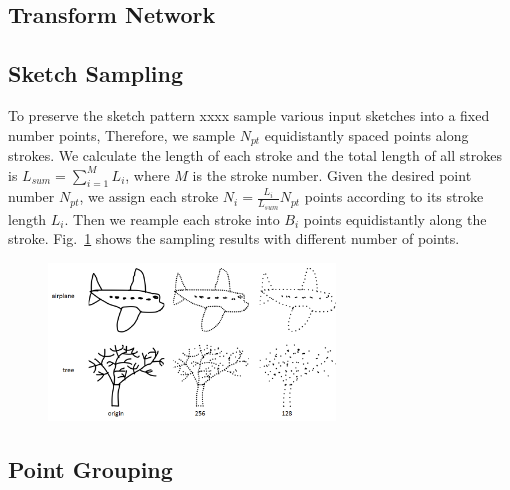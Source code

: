 \subsection{Transform Network}



\subsection{Sketch Sampling}
\label{ssec:resample}

To preserve the sketch pattern xxxx 
sample various input sketches into a fixed number points, 
%
Therefore, we sample $N_{pt}$ equidistantly spaced points along strokes. 
%
We calculate the length of each stroke and the total length of all strokes is $L_{sum}=\sum^{M}_{i=1} L_i$, where $M$ is the stroke number. 
%
Given the desired point number $N_{pt}$, we assign each stroke $N_i=\frac{L_i}{L_{sum}}N_{pt}$ points according to its stroke length $L_i$. 
Then we reample each stroke into $B_i$ points equidistantly along the stroke. 
%
Fig.~\ref{fig:resample} shows the sampling results with different number of points. 


\begin{figure}
	\center
	\includegraphics[width=3in]{images/resample2.png}
	\label{fig:resample}
\end{figure}



\subsection{Point Grouping}
\label{ssec:group_scheme}

